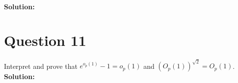 \documentclass[10pt]{article}
\begin{document}
\textbf{Solution:}



\section*{Question 11}

\paragraph{}Interpret and prove that $e^{o_p(1)} -1 = o_p(1)$ and $(O_p(1))^{\sqrt{2}} = O_p(1)$. \\

\textbf{Solution:}
\end{document}
